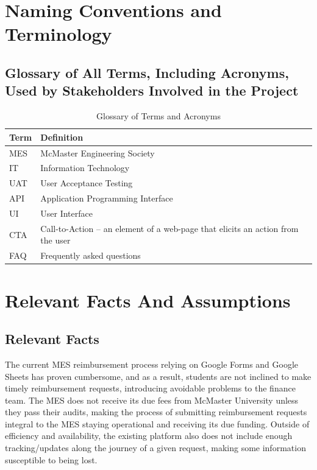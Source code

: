 \documentclass[12pt]{article}
\begin{document}
\section{Naming Conventions and Terminology}
\subsection{Glossary of All Terms, Including Acronyms, Used by Stakeholders Involved in the Project}
\begin{table}[h]
    \centering
    \begin{tabular}{|>{\raggedright}p{3cm}|>{\raggedright\arraybackslash}p{10cm}|}
        \hline
        \textbf{Term} & \textbf{Definition} \\
        \hline
        MES & McMaster Engineering Society \\
        \hline
        IT & Information Technology \\
        \hline
        UAT & User Acceptance Testing \\
        \hline
        API & Application Programming Interface \\
        \hline
        UI & User Interface \\
        \hline
        CTA & Call-to-Action – an element of a web-page that elicits an action from the user \\
        \hline
        FAQ & Frequently asked questions \\
        \hline
    \end{tabular}
    \caption{Glossary of Terms and Acronyms}
    \label{tab:glossary}
\end{table}


\section{Relevant Facts And Assumptions}
\subsection{Relevant Facts}
The current MES reimbursement process relying on Google Forms and Google Sheets has proven cumbersome, and as a result, students are not inclined to make timely reimbursement requests, introducing avoidable problems to the finance team.
The MES does not receive its due fees from McMaster University unless they pass their audits, making the process of submitting reimbursement requests integral to the MES staying operational and receiving its due funding.
Outside of efficiency and availability, the existing platform also does not include enough tracking/updates along the journey of a given request, making some information susceptible to being lost.
\end{document}
